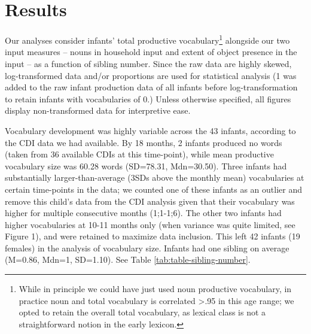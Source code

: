 \documentclass[
  man,mask,floatsintext]{apa6}
\begin{document}
\hypertarget{results}{%
\section{Results}\label{results}}

Our analyses consider infants' total productive vocabulary\footnote{While in principle we could have just used noun productive vocabulary, in practice noun and total vocabulary is correlated \textgreater.95 in this age range; we opted to retain the overall total vocabulary, as lexical class is not a straightforward notion in the early lexicon.} alongside our two input measures -- nouns in household input and extent of object presence in the input -- as a function of sibling number. Since the raw data are highly skewed, log-transformed data and/or proportions are used for statistical analysis (1 was added to the raw infant production data of all infants before log-transformation to retain infants with vocabularies of 0.) Unless otherwise specified, all figures display non-transformed data for interpretive ease.

Vocabulary development was highly variable across the 43 infants, according to the CDI data we had available. By 18 months, 2 infants produced no words (taken from 36 available CDIs at this time-point), while mean productive vocabulary size was 60.28 words (SD=78.31, Mdn=30.50). Three infants had substantially larger-than-average (3SDs above the monthly mean) vocabularies at certain time-points in the data; we counted one of these infants as an outlier and remove this child's data from the CDI analysis given that their vocabulary was higher for multiple consecutive months (1;1-1;6). The other two infants had higher vocabularies at 10-11 months only (when variance was quite limited, see Figure 1), and were retained to maximize data inclusion. This left 42 infants (19 females) in the analysis of vocabulary size. Infants had one sibling on average (M=0.86, Mdn=1, SD=1.10). See Table \ref{tab:table-sibling-number}.
\end{document}
